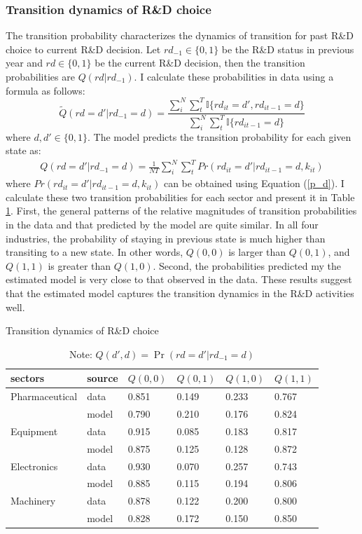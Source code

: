 \documentclass[11pt]{article}
\begin{document}
\subsubsection{Transition dynamics of R\&D choice}
The transition probability characterizes the dynamics of transition for past R\&D choice to current R\&D decision. Let $rd_{-1}\in\{0,1\}$ be the R\&D status in previous year and $rd\in\{0,1\}$ be the current R\&D decision, then the transition probabilities are $Q(rd|rd_{-1})$. I calculate these probabilities in data using a formula as follows:
\begin{equation}
\tilde Q(rd=d'|rd_{-1}=d)=\frac{\sum_{i}^{N}\sum_{t}^{T} \mathbb{I}\{rd_{it}=d',rd_{it-1}=d\}}{\sum_{i}^{N}\sum_{t}^{T} \mathbb{I}\{rd_{it-1}=d\}}
\end{equation}
where $d,d'\in\{0,1\}$. The model predicts the transition probability for each given state as:
\begin{align}
Q(rd=d'|rd_{-1}=d)=\frac{1}{NT}\sum_{i}^N\sum_{t}^T Pr(rd_{it}=d'|rd_{it-1}=d,k_{it})
\end{align}
where $Pr(rd_{it}=d'|rd_{it-1}=d,k_{it})$ can be obtained using Equation (\ref{p_d}). I calculate these two transition probabilities for each sector and present it in Table \ref{T16}. First, the general patterns of the relative magnitudes of transition probabilities in the data and that predicted by the model are quite similar. In all four industries, the probability of staying in previous state is much higher than transiting to a new state. In other words, $Q(0,0)$ is larger than $Q(0,1)$, and $Q(1,1)$ is greater than $Q(1,0)$. Second, the probabilities predicted my the estimated model is very close to that observed in the data. These results suggest that the estimated model captures the transition dynamics in the R\&D activities well. 
\begin{table}[h]
\centering
\caption{Transition dynamics of R\&D choice}
\label{T16}
\begin{tabular}{llllll}
\toprule
sectors      & source  &$Q(0,0)$  &$Q(0,1)$  &$Q(1,0)$ &$Q(1,1)$ \\
\hline
Pharmaceutical & data  & 0.851 & 0.149 & 0.233 & 0.767 \\
               & model & 0.790 & 0.210 & 0.176 & 0.824 \\
Equipment      & data  & 0.915 & 0.085 & 0.183 & 0.817 \\
               & model & 0.875 & 0.125 & 0.128 & 0.872 \\
Electronics    & data  & 0.930 & 0.070 & 0.257 & 0.743 \\
               & model & 0.885 & 0.115 & 0.194 & 0.806 \\
Machinery      & data  & 0.878 & 0.122 & 0.200 & 0.800 \\
               & model & 0.828 & 0.172 & 0.150 & 0.850 \\ 
               \bottomrule
\end{tabular}
\caption*{\small{}Note: $Q(d',d)=\Pr(rd=d'|rd_{-1}=d)$}{\small \par}
\end{table}
\end{document}
